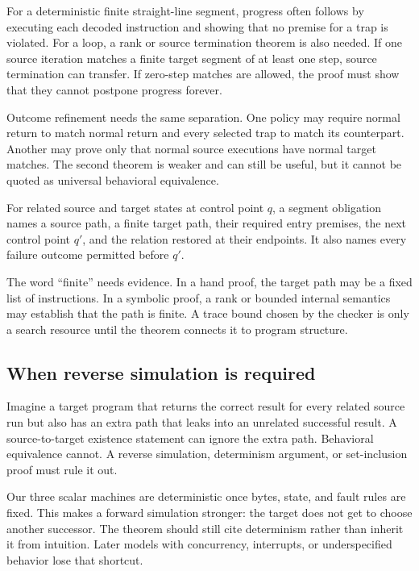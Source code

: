 For a deterministic finite straight-line segment, progress often follows by
executing each decoded instruction and showing that no premise for a trap is
violated. For a loop, a rank or source termination theorem is also needed. If
one source iteration matches a finite target segment of at least one step, source
termination can transfer. If zero-step matches are allowed, the proof must
show that they cannot postpone progress forever.

Outcome refinement needs the same separation. One policy may require normal
return to match normal return and every selected trap to match its counterpart.
Another may prove only that normal source executions have normal target
matches. The second theorem is weaker and can still be useful, but it cannot be
quoted as universal behavioral equivalence.

\begin{definition}[title={Segment simulation obligation}]
For related source and target states at control point \(q\), a segment
obligation names a source path, a finite target path, their required entry
premises, the next control point \(q'\), and the relation restored at their
endpoints. It also names every failure outcome permitted before \(q'\).
\end{definition}

The word ``finite'' needs evidence. In a hand proof, the target path may be a
fixed list of instructions. In a symbolic proof, a rank or bounded internal
semantics may establish that the path is finite. A trace bound chosen by the checker is only
a search resource until the theorem connects it to program structure.

\subsection{When reverse simulation is required}

Imagine a target program that returns the correct result for every related
source run but also has an extra path that leaks into an unrelated successful
result. A source-to-target existence statement can ignore the extra path.
Behavioral equivalence cannot. A reverse simulation, determinism argument, or
set-inclusion proof must rule it out.

Our three scalar machines are deterministic once bytes, state, and fault rules
are fixed. This makes a forward simulation stronger: the target does not get to
choose another successor. The theorem should still cite determinism rather
than inherit it from intuition. Later models with concurrency, interrupts, or
underspecified behavior lose that shortcut.

